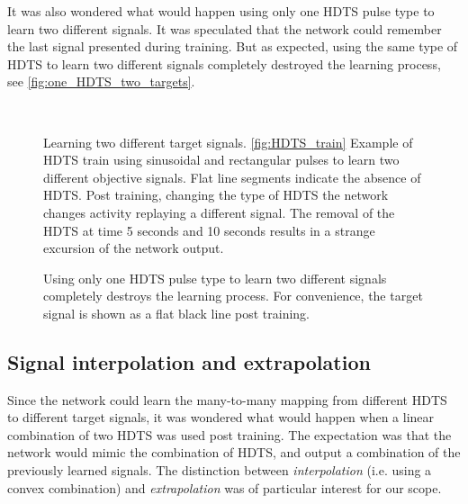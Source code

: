 \documentclass[10pt,a4paper, final]{report} %
\begin{document}
It was also wondered what would happen using only one HDTS pulse type to learn two different signals. It was speculated that the network could remember the last signal presented during training.
But as expected, using the same type of HDTS to learn two different signals completely destroyed the learning process, see \autoref{fig:one_HDTS_two_targets}.


\begin{figure}[H]
\\
\caption{Learning two different target signals. \autoref{fig:HDTS_train} Example of HDTS train using sinusoidal and rectangular pulses to learn two different objective signals. Flat line segments indicate the absence of HDTS. Post training, changing the type of HDTS the network changes activity replaying a different signal. The removal of the HDTS at time 5 seconds and 10 seconds results in a strange excursion of the network output. }
\label{fig:multi_HDTS_multi_target} 
\end{figure}

\begin{figure}[H]
\centering
{} 
\caption{Using only one HDTS pulse type to learn two different signals completely destroys the learning process. For convenience, the target signal is shown as a flat black line post training.}
\label{fig:one_HDTS_two_targets}
\end{figure}


\subsection{Signal interpolation and extrapolation}
Since the network could learn the many-to-many mapping from different HDTS to different target signals, it was wondered what would happen when a linear combination of two HDTS was used post training. The expectation was that the network would mimic the combination of HDTS, and output a combination of the previously learned signals. The distinction between \textit{interpolation} (i.e. using a convex combination) and \textit{extrapolation} was of particular interest for our scope. 
\end{document}
